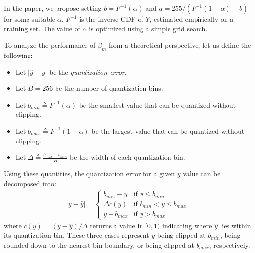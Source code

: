 \documentclass[]{article}
\begin{document}
In the paper, we propose setting $b = F^{-1}(\alpha)$ and $a = 255 / (F^{-1}(1 - \alpha) - b)$ for some suitable $\alpha$. $F^{-1}$ is the inverse CDF of $Y$, estimated empirically on a training set. The value of $\alpha$ is optimized using a simple grid search.

To analyze the performance of $\beta_m$ from a theoretical perspective, let us define the following:
\begin{itemize}
\itemsep1.5mm
\item{Let $|\hat{y} - y|$ be the \textit{quantization error}. }
\item{Let $B = 256$ be the number of quantization bins.}
\item{Let $b_{min} \triangleq F^{-1}(\alpha)$ be the smallest value that can be quantized without clipping.}
\item{Let $b_{max} \triangleq F^{-1}(1 - \alpha)$ be the largest value that can be quantized without clipping.}
\item{Let $\Delta \triangleq \frac{b_{max} - b_{min} }{ B }$ be the width of each quantization bin.}
\end{itemize}

Using these quantities, the quantization error for a given $y$ value can be decomposed into:
\begin{align} \label{eq:decomposition}
    |y - \hat{y}| =
    \begin{cases}
        b_{min} - y         & \text{if } y \le b_{min} \\
        \Delta c(y)         & \text{if } b_{min} < y \le b_{max} \\
        y - b_{max}         & \text{if } y > b_{max}
    \end{cases}
\end{align}
where $c(y) = (y - \hat{y}) / \Delta$ returns a value in $[0, 1)$ indicating where $\hat{y}$ lies within its quantization bin. These three cases represent $y$ being clipped at $b_{min}$, being rounded down to the nearest bin boundary, or being clipped at $b_{max}$, respectively.
\end{document}
